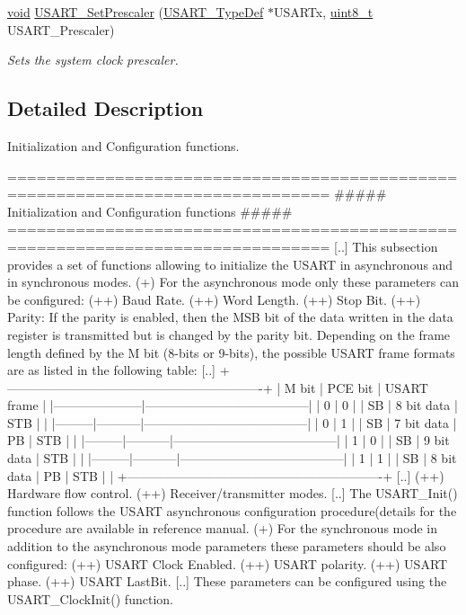 \begin{DoxyCompactItemize}
\hyperlink{group___n_a_m_e_ga18028b8badbf1ea7e704ccac3c488e82}{void} \hyperlink{group___u_s_a_r_t___group1_gaf5da8f2eee8245425584d85d4f62cc33}{U\-S\-A\-R\-T\-\_\-\-Set\-Prescaler} (\hyperlink{struct_u_s_a_r_t___type_def}{U\-S\-A\-R\-T\-\_\-\-Type\-Def} $\ast$U\-S\-A\-R\-Tx, \hyperlink{stdint_8h_aba7bc1797add20fe3efdf37ced1182c5}{uint8\-\_\-t} U\-S\-A\-R\-T\-\_\-\-Prescaler)
\begin{DoxyCompactList}\small\item\em Sets the system clock prescaler. \end{DoxyCompactList}\end{DoxyCompactItemize}


\subsection{Detailed Description}
Initialization and Configuration functions. \begin{DoxyVerb} ===============================================================================
           ##### Initialization and Configuration functions #####
 ===============================================================================  
  [..]
      This subsection provides a set of functions allowing to initialize the USART 
      in asynchronous and in synchronous modes.
       (+) For the asynchronous mode only these parameters can be configured: 
            (++) Baud Rate.
            (++) Word Length. 
            (++) Stop Bit.
            (++) Parity: If the parity is enabled, then the MSB bit of the data written
                 in the data register is transmitted but is changed by the parity bit.
                 Depending on the frame length defined by the M bit (8-bits or 9-bits),
                 the possible USART frame formats are as listed in the following table:
    [..]
   +-------------------------------------------------------------+     
   |   M bit |  PCE bit  |            USART frame                |
   |---------------------|---------------------------------------|             
   |    0    |    0      |    | SB | 8 bit data | STB |          |
   |---------|-----------|---------------------------------------|  
   |    0    |    1      |    | SB | 7 bit data | PB | STB |     |
   |---------|-----------|---------------------------------------|  
   |    1    |    0      |    | SB | 9 bit data | STB |          |
   |---------|-----------|---------------------------------------|  
   |    1    |    1      |    | SB | 8 bit data | PB | STB |     |
   +-------------------------------------------------------------+            
    [..]
           (++) Hardware flow control.
           (++) Receiver/transmitter modes.
    [..] The USART_Init() function follows the USART  asynchronous configuration 
         procedure(details for the procedure are available in reference manual.
        (+) For the synchronous mode in addition to the asynchronous mode parameters
            these parameters should be also configured:
            (++) USART Clock Enabled.
            (++) USART polarity.
            (++) USART phase.
            (++) USART LastBit.
    [..] These parameters can be configured using the USART_ClockInit() function.\end{DoxyVerb}


